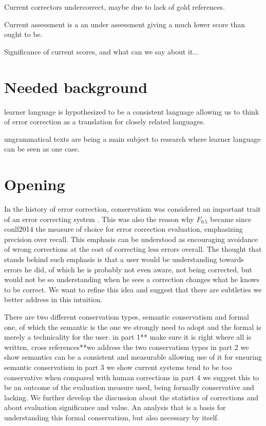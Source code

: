 \documentclass[11pt]{article}
\begin{document}
Current correctors undercorrect, maybe due to lack of gold references.

Current assessment is a an under assessment giving a much lower score
than ought to be.

Significance of current scores, and what can we say about it...

\section{Needed background}

learner language is hypothesized to be a consistent language allowing
us to think of error correction as a translation for closely related
languages.

ungrammatical texts are being a main subject to research where learner
language can be seen as one case.

\section{Opening}

In the history of error correction, conservatism was considered an
important trait of an error correcting system \cite{brockett2006correcting}.
This was also the reason why $F_{0.5}$ became since conll2014 \cite{ng2014conll}
the measure of choice for error correction evaluation, emphasizing
precision over recall. This emphasis can be understood as encouraging
avoidance of wrong corrections at the cost of correcting less errors
overall. The thought that stands behind such emphasis is that a user
would be understanding towards errors he did, of which he is probably
not even aware, not being corrected, but would not be so understanding
when he sees a correction changes what he knows to be correct. We want to refine
this idea and suggest that there are subtleties we better address
in this intuition.

There are two different conservatism
types, semantic conservatism and formal one, of which the semantic
is the one we strongly need to adopt and the formal is merely a technicality
for the user. in part 1{*}{*} make sure it is right where all is written,
cross references{*}{*}we address the two conservatism types in part
2 we show semantics can be a consistent and measurable allowing use
of it for ensuring semantic conservatism in part 3 we show current
systems tend to be too conservative when compared with human
corrections in part 4 we suggest this to be an outcome of the evaluation
measure used, being formally conservative and lacking. We further develop
 the discussion about the statistics of corrections 
 and about evaluation significance and value. 
 An analysis that is a basis for understanding this formal conservatism, 
 but also necessary by itself.
\end{document}
